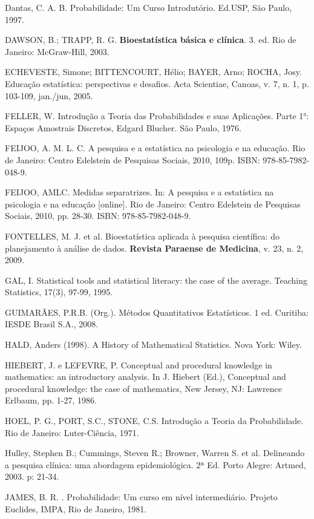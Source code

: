 Dantas, C. A. B. Probabilidade: Um Curso Introdutório. Ed.USP, São Paulo, 1997.\vskip0.3cm

DAWSON, B.; TRAPP, R. G. \textbf{Bioestatística básica e clínica}. 3. ed. Rio de Janeiro: McGraw-Hill, 2003. \vskip0.3cm

ECHEVESTE, Simone; BITTENCOURT, Hélio; BAYER, Arno; ROCHA, Josy. Educação estatística: perspectivas e desafios. Acta Scientiae, Canoas, v. 7, n. 1, p. 103-109, jan./jun, 2005.\vskip0.3cm

FELLER, W. Introdução a Teoria das Probabilidades e suas
Aplicações. Parte 1°: Espaços Amostrais Discretos, Edgard Blucher. São Paulo, 1976.\vskip0.3cm

FEIJOO, A. M. L. C. A pesquisa e a estatística na psicologia e na educação. Rio de Janeiro:
Centro Edelstein de Pesquisas Sociais, 2010, 109p. ISBN: 978-85-7982-048-9.\vskip0.3cm

FEIJOO, AMLC. Medidas separatrizes. In: A pesquisa e a estatística na psicologia e na educação
[online]. Rio de Janeiro: Centro Edelstein de Pesquisas Sociais, 2010, pp. 28-30. ISBN: 978-85-7982-048-9.\vskip0.3cm

FONTELLES, M. J. et al. Bioestatística aplicada à pesquisa científica: do planejamento à análise de dados. \textbf{Revista Paraense de Medicina}, v. 23, n. 2, 2009. \vskip0.3cm


GAL, I. Statistical tools and statistical literacy: the case of the average. Teaching
Statistics, 17(3), 97-99, 1995.\vskip0.3cm

GUIMARÃES, P.R.B. (Org.). Métodos Quantitativos Estatísticos. 1 ed. Curitiba: IESDE Brasil S.A., 2008. \vskip0.3cm

HALD, Anders (1998). A History of Mathematical Statistics. Nova York: Wiley. \vskip0.3cm

HIEBERT, J. e LEFEVRE, P. Conceptual and procedural knowledge in mathematics: an introductory analysis. In J. Hiebert (Ed.), Conceptual and procedural knowledge: the case of mathematics, New Jersey, NJ: Lawrence Erlbaum, pp. 1-27, 1986.\vskip0.3cm

HOEL, P. G., PORT, S.C., STONE, C.S. Introdução a Teoria da Probabilidade. Rio de Janeiro: Luter-Ciência, 1971.\vskip0.3cm

\newpage
Hulley, Stephen B.; Cummings, Steven R.; Browner, Warren S. et al. Delineando a pesquisa clínica: uma abordagem epidemiológica. 2ª Ed. Porto Alegre: Artmed, 2003. p: 21-34.\vskip0.3cm

JAMES, B. R. . Probabilidade: Um curso em nível intermediário.
Projeto Euclides, IMPA, Rio de Janeiro, 1981. \vskip0.3cm

